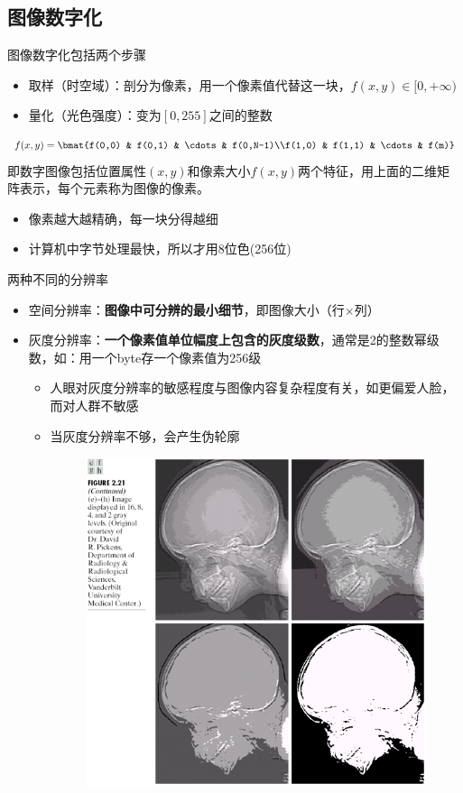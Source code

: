 \subsection{图像数字化}
图像数字化包括两个步骤
\begin{itemize}
\item 取样（时空域）：剖分为像素，用一个像素值代替这一块，$f(x,y)\in[0,+\infty)$
\item 量化（光色强度）：变为$[0,255]$之间的整数
\end{itemize}
\[f(x,y)=\bmat{f(0,0) & f(0,1) & \cdots & f(0,N-1)\\f(1,0) & f(1,1) & \cdots & f(m)}\]
即数字图像包括位置属性$(x,y)$和像素大小$f(x,y)$两个特征，用上面的二维矩阵表示，每个元素称为图像的像素。
\begin{itemize}
\item 像素越大越精确，每一块分得越细
\item 计算机中字节处理最快，所以才用8位色(256位)
\end{itemize}

两种不同的分辨率
\begin{itemize}
\item 空间分辨率：\textbf{图像中可分辨的最小细节}，即图像大小（行$\times$列）
\item 灰度分辨率：\textbf{一个像素值单位幅度上包含的灰度级数}，通常是2的整数幂级数，如：用一个byte存一个像素值为256级
\begin{itemize}
	\item 人眼对灰度分辨率的敏感程度与图像内容复杂程度有关，如更偏爱人脸，而对人群不敏感
	\item 当灰度分辨率不够，会产生伪轮廓
\begin{figure}[H]
\centering
\includegraphics[width=0.5\linewidth]{fig/pseudo-contour.png}
\end{figure}
\end{itemize}
\end{itemize}

